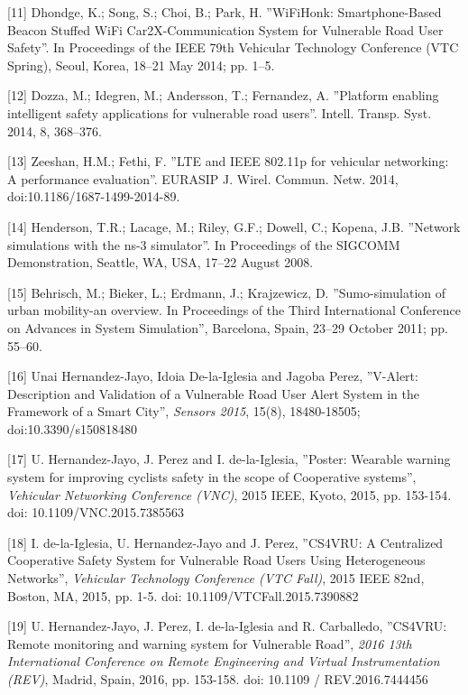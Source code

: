 [11] Dhondge, K.; Song, S.; Choi, B.; Park, H. ''WiFiHonk: Smartphone-Based
Beacon Stuffed WiFi Car2X-Communication System for Vulnerable Road User
Safety''. In Proceedings of the IEEE 79th Vehicular Technology Conference
(VTC Spring), Seoul, Korea, 18–21 May 2014; pp. 1–5.

[12] Dozza, M.; Idegren, M.; Andersson, T.; Fernandez, A. ''Platform enabling
intelligent safety applications for vulnerable road users''. Intell. Transp.
Syst. 2014, 8, 368–376.

[13] Zeeshan, H.M.; Fethi, F. ''LTE and IEEE 802.11p for vehicular networking:
A performance evaluation''. EURASIP J. Wirel. Commun. Netw. 2014,
doi:10.1186/1687-1499-2014-89.

[14] Henderson, T.R.; Lacage, M.; Riley, G.F.; Dowell, C.; Kopena, J.B.
''Network simulations with the ns-3 simulator''. In Proceedings of the SIGCOMM
Demonstration, Seattle, WA, USA, 17–22 August 2008.

[15] Behrisch, M.; Bieker, L.; Erdmann, J.; Krajzewicz, D. ''Sumo-simulation
of urban mobility-an overview. In Proceedings of the Third International
Conference on Advances in System Simulation'', Barcelona, Spain, 23–29 October
2011; pp. 55–60.

[16] Unai Hernandez-Jayo, Idoia De-la-Iglesia and Jagoba Perez, ''V-Alert:
Description and Validation of a Vulnerable Road User Alert System in the
Framework of a Smart City'', \emph{Sensors 2015}, 15(8), 18480-18505;
doi:10.3390/s150818480

[17] U. Hernandez-Jayo, J. Perez and I. de-la-Iglesia, ''Poster: Wearable
warning system for improving cyclists safety in the scope of Cooperative
systems'', \emph{Vehicular Networking Conference (VNC)}, 2015 IEEE, Kyoto,
2015, pp. 153-154. doi: 10.1109/VNC.2015.7385563

[18] I. de-la-Iglesia, U. Hernandez-Jayo and J. Perez, ''CS4VRU: A Centralized
Cooperative Safety System for Vulnerable Road Users Using Heterogeneous
Networks'', \emph{Vehicular Technology Conference (VTC Fall)}, 2015 IEEE 82nd,
Boston, MA, 2015, pp. 1-5. doi: 10.1109/VTCFall.2015.7390882

[19] U. Hernandez-Jayo, J. Perez, I. de-la-Iglesia and R. Carballedo,
''CS4VRU: Remote monitoring and warning system for Vulnerable Road'',
\emph{2016 13th International Conference on Remote Engineering and Virtual
Instrumentation (REV)}, Madrid, Spain, 2016, pp. 153-158. doi: 10.1109 /
REV.2016.7444456

